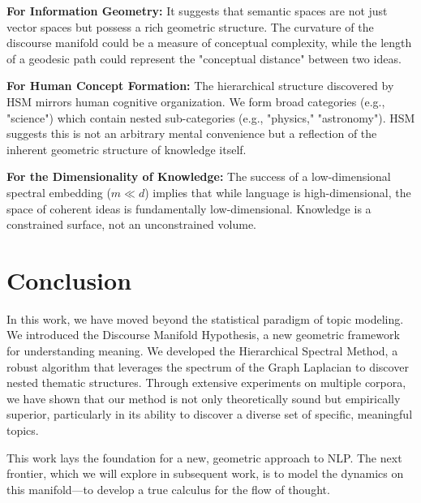 \documentclass[conference]{IEEEtran}
\theoremstyle{definition}
\begin{document}
\textbf{For Information Geometry:} It suggests that semantic spaces are not just vector spaces but possess a rich geometric structure. The curvature of the discourse manifold could be a measure of conceptual complexity, while the length of a geodesic path could represent the "conceptual distance" between two ideas.

\textbf{For Human Concept Formation:} The hierarchical structure discovered by HSM mirrors human cognitive organization. We form broad categories (e.g., "science") which contain nested sub-categories (e.g., "physics," "astronomy"). HSM suggests this is not an arbitrary mental convenience but a reflection of the inherent geometric structure of knowledge itself.

\textbf{For the Dimensionality of Knowledge:} The success of a low-dimensional spectral embedding ($m \ll d$) implies that while language is high-dimensional, the space of coherent ideas is fundamentally low-dimensional. Knowledge is a constrained surface, not an unconstrained volume.

\section{Conclusion}
In this work, we have moved beyond the statistical paradigm of topic modeling. We introduced the Discourse Manifold Hypothesis, a new geometric framework for understanding meaning. We developed the Hierarchical Spectral Method, a robust algorithm that leverages the spectrum of the Graph Laplacian to discover nested thematic structures. Through extensive experiments on multiple corpora, we have shown that our method is not only theoretically sound but empirically superior, particularly in its ability to discover a diverse set of specific, meaningful topics.

This work lays the foundation for a new, geometric approach to NLP. The next frontier, which we will explore in subsequent work, is to model the dynamics on this manifold—to develop a true calculus for the flow of thought.

\printbibliography
\balance
\end{document}
